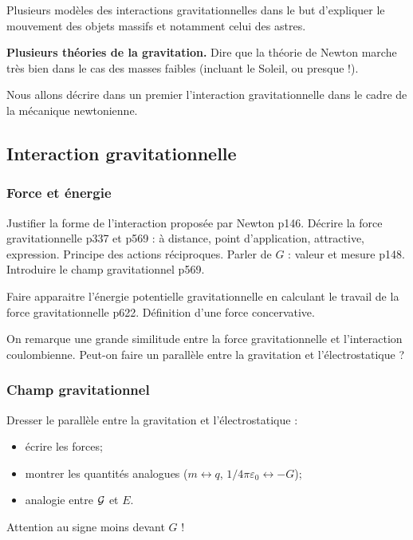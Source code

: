 Plusieurs modèles des interactions gravitationnelles dans le but d'expliquer le mouvement des objets massifs et notamment celui des astres.
\begin{slide}
\textbf{Plusieurs théories de la gravitation.}
Dire que la théorie de Newton marche très bien dans le cas des masses faibles (incluant le Soleil, ou presque !).
\end{slide}

\begin{transition}
Nous allons décrire dans un premier l'interaction gravitationnelle dans le cadre de la mécanique newtonienne.
\end{transition}

\subsection{Interaction gravitationnelle}

\subsubsection{Force et énergie}

Justifier la forme de l'interaction proposée par Newton \cite{Faroux1996}p146.
Décrire la force gravitationnelle \cite{Michel2017} p337 et \cite{Salamito2016} p569 : à distance, point d'application, attractive, expression.
Principe des actions réciproques.
Parler de $G$ : valeur et mesure \cite{Faroux1996} p148.
Introduire le champ gravitationnel \cite{Salamito2016} p569.

Faire apparaitre l'énergie potentielle gravitationnelle en calculant le travail de la force gravitationnelle \cite{Salamito2016} p622.
Définition d'une force concervative.

\begin{transition}
On remarque une grande similitude entre la force gravitationnelle et l'interaction coulombienne.
Peut-on faire un parallèle entre la gravitation et l'électrostatique ?
\end{transition}

\subsubsection{Champ gravitationnel}

Dresser le parallèle entre la gravitation et l'électrostatique :
\begin{itemize}
\item écrire les forces;
\item montrer les quantités analogues ($m \leftrightarrow q$, $1/4\pi\varepsilon_0 \leftrightarrow -G$);
\item analogie entre ${\cal{G}}$ et $E$.
\end{itemize}
\begin{remarque}
Attention au signe moins devant $G$ ! 
\end{remarque}

